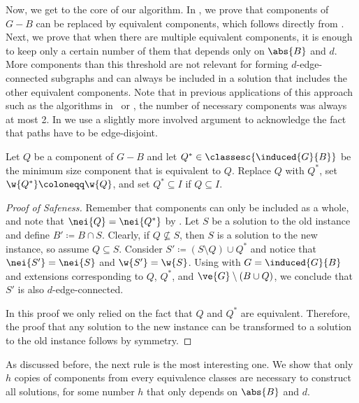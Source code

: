 \begin{lemma}
\begin{lemma}
\begin{lemma}
\begin{lemma}
\begin{lemma}
\begin{theorem}
\begin{reduction*}
\begin{lemma}
Now, we get to the core of our algorithm. In , we prove that components of $G-B$ can be replaced by equivalent components, which follows directly from . Next, we prove that when there are multiple equivalent components, it is enough to keep only a certain number of them that depends only on $\abs{B}$ and $d$. More components than this threshold are not relevant for forming $d$-edge-connected subgraphs and can always be included in a solution that includes the other equivalent components. Note that in previous applications of this approach such as the algorithms in~\cite{golovach2020finding} or , the number of necessary components was always at most 2. In  we use a slightly more involved argument to acknowledge the fact that paths have to be edge-disjoint.

\iflong
\begin{reduction*}
\else
\begin{reduction*}[$\star$]
\fi
\label{red:d_edge_twins}
  Let $Q$ be a component of $G-B$ and let $Q^* \in \classesc{\induced{G}{B}}$ be the minimum size component that is equivalent to $Q$. Replace $Q$ with $Q^*$, set $\w{Q^*} \coloneqq \w{Q}$, and set $Q^* \subseteq I$ if $Q \subseteq I$.
\end{reduction*}
\iflong
\begin{proof}[Proof of Safeness]
  Remember that components can only be included as a whole, and note that $\nei{Q} = \nei{Q^*}$ by . Let $S$ be a solution to the old instance and define $B' \coloneqq B \cap S$. Clearly, if $Q \not\subseteq S$, then $S$ is a solution to the new instance, so assume $Q \subseteq S$. Consider $S' \coloneqq (S \setminus Q) \cup Q^*$ and notice that $\nei{S'} = \nei{S}$ and $\w{S'} = \w{S}$. 
  Using  with $G = \induced{G}{B}$ and extensions corresponding to $Q$, $Q^*$, and $\ve{G} \setminus (B \cup Q)$, we conclude that $S'$ is also $d$-edge-connected.

  In this proof we only relied on the fact that $Q$ and $Q^*$ are equivalent. Therefore, the proof that any solution to the new instance can be transformed to a solution to the old instance follows by symmetry.
\end{proof}
\fi

As discussed before, the next rule is the most interesting one. We show that only $h$ copies of components from every equivalence classes are necessary to construct all solutions, for some number $h$ that only depends on $\abs{B}$ and $d$.


\end{reduction*}
\end{lemma}
\end{reduction*}
\end{theorem}
\end{lemma}
\end{lemma}
\end{lemma}
\end{lemma}
\end{lemma}
